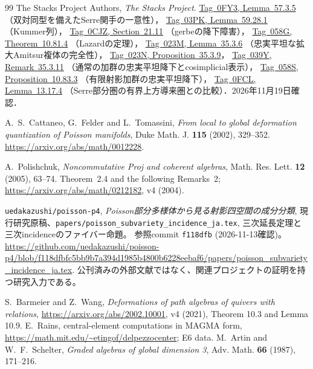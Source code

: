 \documentclass[11pt,a4paper]{ltjsarticle}
\numberwithin{equation}{section}
\begin{document}
\begin{thebibliography}{99}
The Stacks Project Authors, \emph{The Stacks Project}.
\href{https://stacks.math.columbia.edu/tag/0FY3}{Tag~0FY3, Lemma~57.3.5}
（双対同型を備えたSerre関手の一意性），
\href{https://stacks.math.columbia.edu/tag/03PK}{Tag~03PK, Lemma~59.28.1}
（Kummer列），
\href{https://stacks.math.columbia.edu/tag/0CJZ}{Tag~0CJZ, Section~21.11}
（gerbeの降下障害），
\href{https://stacks.math.columbia.edu/tag/058G}{Tag~058G, Theorem~10.81.4}
（Lazardの定理），
\href{https://stacks.math.columbia.edu/tag/023M}{Tag~023M, Lemma~35.3.6}
（忠実平坦な拡大Amitsur複体の完全性），
\href{https://stacks.math.columbia.edu/tag/023N}{Tag~023N, Proposition~35.3.9}，
\href{https://stacks.math.columbia.edu/tag/039Y}{Tag~039Y, Remark~35.3.11}
（通常の加群の忠実平坦降下とcosimplicial表示），
\href{https://stacks.math.columbia.edu/tag/058S}{Tag~058S, Proposition~10.83.3}
（有限射影加群の忠実平坦降下），
\href{https://stacks.math.columbia.edu/tag/0FCL}{Tag~0FCL, Lemma~13.17.4}
（Serre部分圏の有界上方導来圏との比較）．2026年11月19日確認．

A.~S.~Cattaneo, G.~Felder and L.~Tomassini,
\emph{From local to global deformation quantization of Poisson manifolds},
Duke Math. J. \textbf{115} (2002), 329--352.
\url{https://arxiv.org/abs/math/0012228}.

A.~Polishchuk,
\emph{Noncommutative Proj and coherent algebras},
Math. Res. Lett. \textbf{12} (2005), 63--74.
Theorem~2.4 and the following Remarks~2;
\url{https://arxiv.org/abs/math/0212182}, v4 (2004).

\texttt{uedakazushi/poisson-p4},
\emph{Poisson部分多様体から見る射影四空間の成分分類},
現行研究原稿、\nolinkurl{papers/poisson_subvariety_incidence_ja.tex},
三次延長定理と三次incidenceのファイバー命題。
参照commit \texttt{f118dfb} (2026-11-13確認)。
\url{https://github.com/uedakazushi/poisson-p4/blob/f118dfbfc5bb9b7a394d1985b4800b6228eebaf6/papers/poisson_subvariety_incidence_ja.tex}.
公刊済みの外部文献ではなく、関連プロジェクトの証明を持つ研究入力である。

 S.~Barmeier and Z.~Wang,
\emph{Deformations of path algebras of quivers with relations},
\url{https://arxiv.org/abs/2002.10001}, v4 (2021), Theorem 10.3 and Lemma 10.9.
 E.~Rains, central-element computations in MAGMA form,
\url{https://math.mit.edu/~etingof/delpezzocenter}; E6 data.
M.~Artin and W.~F.~Schelter,
\textit{Graded algebras of global dimension 3},
Adv. Math. \textbf{66} (1987), 171--216.


\end{thebibliography}
\end{document}
